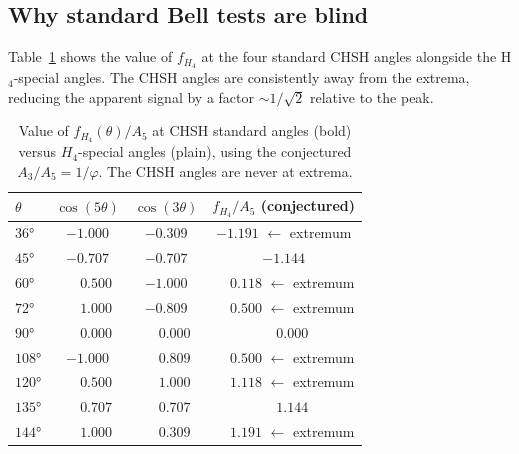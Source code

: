 \documentclass[11pt,a4paper]{article}
\newcommand{\phig}{\varphi}
\begin{document}
\subsection{Why standard Bell tests are blind}

Table~\ref{tab:chsh_values} shows the value of $f_{H_4}$ at the
four standard CHSH angles alongside the H$_4$-special angles.  The
CHSH angles are consistently away from the extrema, reducing the
apparent signal by a factor $\sim 1/\sqrt{2}$ relative to the peak.

\begin{table}[H]
\centering
\caption{Value of $f_{H_4}(\theta)/A_5$ at CHSH standard angles
  (bold) versus $H_4$-special angles (plain), using the conjectured
  $A_3/A_5 = 1/\phig$.  The CHSH angles are never at extrema.}
\label{tab:chsh_values}
\begin{tabular}{@{}lccc@{}}
\toprule
$\theta$ & $\cos(5\theta)$ & $\cos(3\theta)$ &
  $f_{H_4}/A_5$ (conjectured) \\
\midrule
$36°$ & $-1.000$ & $-0.309$ & $-1.191$ \hspace{0.3em}$\leftarrow$ extremum \\
\textbf{$45°$} & $-0.707$ & $-0.707$ & $\mathbf{-1.144}$ \\
$60°$ & $\phantom{-}0.500$ & $-1.000$ & $\phantom{-}0.118$ \hspace{0.3em}$\leftarrow$ extremum \\
$72°$ & $\phantom{-}1.000$ & $-0.809$ & $\phantom{-}0.500$ \hspace{0.3em}$\leftarrow$ extremum \\
\textbf{$90°$} & $\phantom{-}0.000$ & $\phantom{-}0.000$ & $\mathbf{\phantom{-}0.000}$ \\
$108°$ & $-1.000$ & $\phantom{-}0.809$ & $\phantom{-}0.500$ \hspace{0.3em}$\leftarrow$ extremum \\
$120°$ & $\phantom{-}0.500$ & $\phantom{-}1.000$ & $\phantom{-}1.118$ \hspace{0.3em}$\leftarrow$ extremum \\
\textbf{$135°$} & $\phantom{-}0.707$ & $\phantom{-}0.707$ & $\mathbf{\phantom{-}1.144}$ \\
$144°$ & $\phantom{-}1.000$ & $\phantom{-}0.309$ & $\phantom{-}1.191$ \hspace{0.3em}$\leftarrow$ extremum \\
\bottomrule
\end{tabular}
\end{table}
\end{document}
